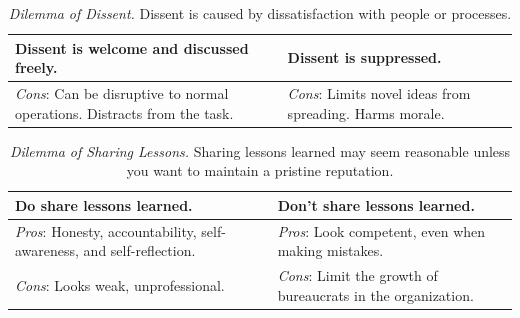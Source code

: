 

\begin{center}
\begin{table}[H] %
\begin{tabular}{ | m{\dilemmatablewidth}| m{\dilemmatablewidth} | } 
  \hline
  \textbf{Dissent is welcome and discussed freely.} & 
  \textbf{Dissent is suppressed.} \\ 
  \hline
  \textit{Cons}: Can be disruptive to normal operations. Distracts from the task. & 
  \textit{Cons}: Limits novel ideas from spreading. Harms morale. \\  
  \hline
\end{tabular}
\caption{
\textit{Dilemma of Dissent.}
Dissent is caused by dissatisfaction with people or processes. 
}
\label{table:how-dissent-is-responded-to}
\end{table}
\end{center}



\begin{center}
\begin{table}[H] %
\begin{tabular}{ | m{\dilemmatablewidth}| m{\dilemmatablewidth} | } 
  \hline
  \textbf{Do share lessons learned.} & 
  \textbf{Don't share lessons learned.} \\ 
  \hline
  \textit{Pros}: Honesty, accountability, self-awareness, and self-reflection. & 
  \textit{Pros}: Look competent, even when making mistakes. \\  
  \hline
  \textit{Cons}: Looks weak, unprofessional. & 
  \textit{Cons}: Limit the growth of bureaucrats in the organization. \\  
  \hline
\end{tabular}
\caption{
\textit{Dilemma of Sharing Lessons.}
Sharing lessons learned may seem reasonable unless you want to maintain a pristine reputation. 
}
\label{table:sharing-lessons-learned}
\end{table}
\end{center}

